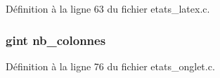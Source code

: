 Définition à la ligne 63 du fichier etats\_\-latex.c.

\subsubsection[{nb\_\-colonnes}]{\setlength{\rightskip}{0pt plus 5cm}gint {\bf nb\_\-colonnes}}\label{etats__latex_8c_a8c9db61caf800767da87c8e115ed2b12}


Définition à la ligne 76 du fichier etats\_\-onglet.c.

